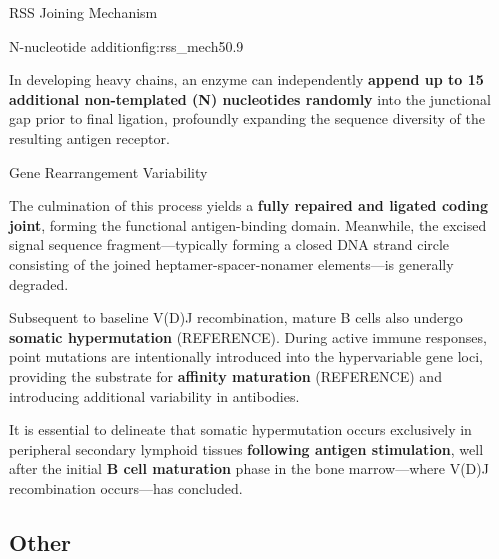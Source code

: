 \begin{core}[label=core:rss_mech]{RSS Joining Mechanism}
\begin{enumerate}
\begin{itemize}
{\begin{scope}[shift={(0,-1)}]
                  \end{scope}
                }{N-nucleotide addition}{fig:rss_mech5}{0.9}

                In developing heavy chains, an enzyme can independently \textbf{append up to 15 additional non-templated (N) nucleotides randomly} into the junctional gap prior to final ligation, profoundly expanding the sequence diversity of the resulting antigen receptor.

            \end{itemize}

        \end{enumerate}

      \end{core}

      \begin{core}{Gene Rearrangement Variability}

        The culmination of this process yields a \textbf{fully repaired and ligated coding joint}, forming the functional antigen-binding domain. Meanwhile, the excised signal sequence fragment---typically forming a closed DNA strand circle consisting of the joined heptamer-spacer-nonamer elements---is generally degraded.

        Subsequent to baseline V(D)J recombination, mature B cells also undergo \textbf{somatic hypermutation} (REFERENCE). During active immune responses, point mutations are intentionally introduced into the hypervariable gene loci, providing the substrate for \textbf{affinity maturation} (REFERENCE) and introducing additional variability in antibodies.

        It is essential to delineate that somatic hypermutation occurs exclusively in peripheral secondary lymphoid tissues \textbf{following antigen stimulation}, well after the initial \textbf{B cell maturation} phase in the bone marrow---where V(D)J recombination occurs---has concluded.

      \end{core}

  \subsection{Other}

